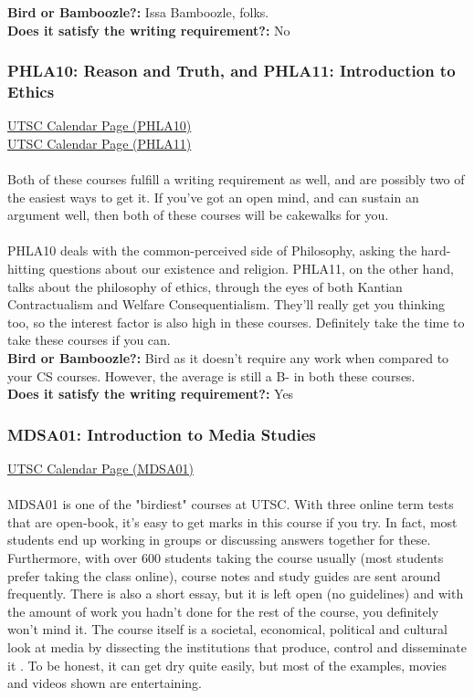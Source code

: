 \documentclass[11pt]{article}
\begin{document}
\textbf{Bird or Bamboozle?:} Issa Bamboozle, folks.\\

\textbf{Does it satisfy the writing requirement?:} No

\subsubsection{PHLA10: Reason and Truth, and PHLA11: Introduction to Ethics}
\href{https://utsc.calendar.utoronto.ca/course/PHLA10H3}{UTSC Calendar Page (PHLA10)}\\
\href{https://utsc.calendar.utoronto.ca/course/PHLA11H3}{UTSC Calendar Page (PHLA11)}\\\\
Both of these courses fulfill a writing requirement as well, and are possibly two of the easiest ways to get it.  If you've got an open mind, and can sustain an argument well, then both of these courses will be cakewalks for you.\\\\ 
PHLA10 deals with the common-perceived side of Philosophy, asking the hard-hitting questions about our existence and religion.  PHLA11, on the other hand, talks about the philosophy of ethics, through the eyes of both Kantian Contractualism and Welfare Consequentialism.  They'll really get you thinking too, so the interest factor is also high in these courses.  Definitely take the time to take these courses if you can.\\

\textbf{Bird or Bamboozle?:} Bird as it doesn't require any work when compared to your CS courses. However, the average is still a B- in both these courses.\\

\textbf{Does it satisfy the writing requirement?:} Yes

\subsubsection{MDSA01: Introduction to Media Studies}
\href{https://utsc.calendar.utoronto.ca/course/MDSA01H3}{UTSC Calendar Page (MDSA01)}\\\\
MDSA01 is one of the "birdiest" courses at UTSC. With three online term tests that are open-book, it's easy to get marks in this course if you try. In fact, most students end up working in groups or discussing answers together for these. Furthermore, with over 600 students taking the course usually (most students prefer taking the class online), course notes and study guides are sent around frequently. There is also a short essay, but it is left open (no guidelines) and with the amount of work you hadn't done for the rest of the course, you definitely won't mind it. The course itself is a societal, economical, political and cultural look at media by dissecting the institutions that produce, control and disseminate it  . To be honest, it can get dry quite easily, but most of the examples, movies and videos shown are entertaining.\\
\end{document}
